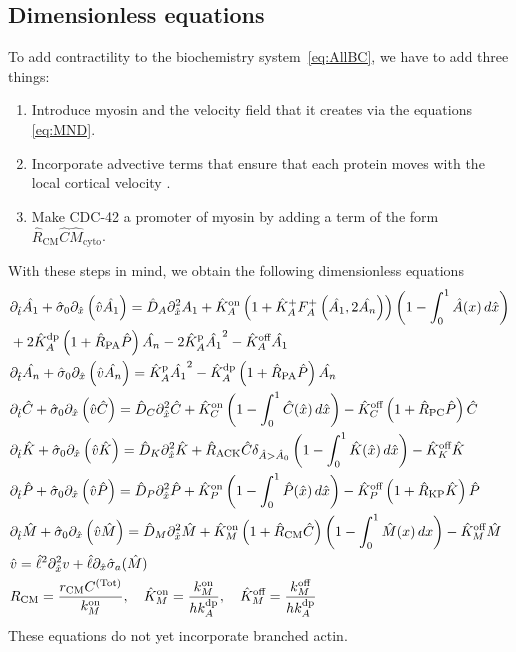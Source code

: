 \documentclass[11pt]{article}
\newcommand{\6}[1]{#1_{\text{6}}}
\newcommand{\3}[1]{#1_{\text{3}}}
\newcommand{\Tot}[1]{#1^\text{(Tot)}}
\newcommand{\A}[1]{#1_A}
\newcommand{\My}[1]{#1_M}
\begin{document}
\subsection{Dimensionless equations}
To add contractility to the biochemistry system\ \eqref{eq:AllBC}, we have to add three things:
\begin{enumerate}
\item Introduce myosin and the velocity field that it creates via the equations \eqref{eq:MND}.
\item Incorporate advective terms that ensure that each protein moves with the local cortical velocity \cite{illukkumbura2023design}. 
\item Make CDC-42 a promoter of myosin by adding a term of the form $\hat R_\text{CM} \hat C \hat{M}_\text{cyto}$. 
\end{enumerate}
With these steps in mind, we obtain the following dimensionless equations
\begin{subequations}
\label{eq:Everything}
\begin{align}
\nonumber
&\Dthat \hat{\MA}  +\hat{\sigma}_0  \Dxhat \left(\hat{v} \hat{\MA} \right) = \DhatA \Dxhat^2 \MA +\KhatonA \left(1+\KhatfA \A{F}^+\left(\hat{\MA},2\hat{\PA}\right)\right)\left(1 - \int_0^1 \hat{A}(x) \, d\hat{x} \right) \\ 
&+ 2\KhatdpA \left(1+\hat{R}_\text{PA}\hat{P}\right)\hat{\PA}-2\KhatpA \hat{\MA}^2 - \KhatoffA \hat{\MA} \\ 
&\Dthat \hat{\PA}+\hat{\sigma}_0  \Dxhat \left(\hat{v} \hat{\PA} \right)  =\KhatpA \hat{\MA}^2- \KhatdpA \left(1+\hat{R}_\text{PA}\hat{P}\right) \hat{\PA} \\ 
&\Dthat \hat{C}+\hat{\sigma}_0  \Dxhat \left(\hat{v} \hat{C} \right)  =\DhatC \Dxhat^2 \hat{C} +\KhatonC \left(1 - \int_0^1 \hat{C}(\hat x) \, d\hat{x} \right)  - \KhatoffC \left(1+\hat{R}_\text{PC}\hat P\right)\hat{C}\\
&\Dthat \hat{K} +\hat{\sigma}_0  \Dxhat \left(\hat{v} \hat{K} \right) = \DhatK \Dxhat^2 \hat{K} + \hat{R}_\text{ACK} \hat{C} \delta_{\hat A > \hat A_0} \left(1 - \int_0^1 \hat{K}(\hat x) \, d\hat{x} \right)-\KhatoffK \hat{K} \\
&\Dthat \hat{P} +\hat{\sigma}_0  \Dxhat \left(\hat{v} \hat{P} \right)  =\DhatP \Dxhat^2 \hat{P} +\KhatonP \left(1 - \int_0^1 \hat{P}(\hat x) \, d\hat{x} \right)  - \KhatoffP \left(1+\hat{R}_\text{KP}\hat{K}\right)\hat{P}\\
&\Dthat \hat{M} +\hat{\sigma}_0  \Dxhat \left(\hat{v} \hat{M} \right) =\hat{D}_M \Dxhat^2 \hat{M} +\KhatonM \left(1+\hat{R}_\text{CM} \hat C\right) \left(1-\int_0^1  \hat{M}(x) \, dx\right)- \KhatoffM \hat{M}\\
&\hat{v} = \hat{\ell}^2 \Dxhat^2 v +\hat{\ell} \Dxhat \hat{\sigma}_a(\hat{M})\\
\label{eq:NewNDs}
&R_\text{CM}=\frac{r_\text{CM}\Tot{C}}{\kon_M},\quad \hat{K}^\text{on}_M= \frac{\My{\kon}}{h \kdp_A}, \quad \hat{K}^\text{off}_M= \frac{\My{\koff}}{h \kdp_A}
\end{align}
\end{subequations}
These equations do not yet incorporate branched actin.
\end{document}
